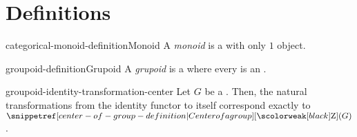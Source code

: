 \documentclass[preview]{standalone}
\begin{document}
\genpage

\section{Definitions}

\begin{snippetdefinition}{categorical-monoid-definition}{Monoid}
    A \emph{monoid} is a \category with only \(1\) object.
\end{snippetdefinition}

\begin{snippetdefinition}{groupoid-definition}{Grupoid}
    A \emph{grupoid} is a \category
    where every \category[morphism][Morphism] is an \catisomorphism.
\end{snippetdefinition}


\begin{snippetproposition}{groupoid-identity-transformation-center}{}
    Let \(G\) be a \groupoid.
    Then, the natural transformations from the identity functor to itself
    correspond exactly to \(\groupcenter(G)\).
\end{snippetproposition}
\end{document}
